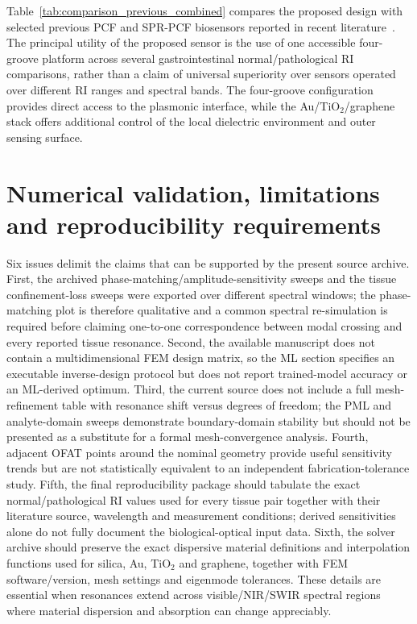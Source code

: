 \documentclass[5p,times,twocolumn]{elsarticle}
\begin{document}
Table~\ref{tab:comparison_previous_combined} compares the proposed design with selected previous PCF and SPR-PCF biosensors reported in recent literature~\cite{Yasli2021Cancer,Mittal2023Photonics,Ehyaee2023EPJ,Chaudhary2022TNB,Sardar2024JSEN,Abdelghaffar2024JOSAB,Ibrahimi2023Plasmonics,Yang2023Plasmonics,Pappu2024Plasmonics,Arafin2024OME,Ashrafian2025SciRep,Khodatars2025SciRep,Jamil2025SBSR,Alam2025SBSR}. The principal utility of the proposed sensor is the use of one accessible four-groove platform across several gastrointestinal normal/pathological RI comparisons, rather than a claim of universal superiority over sensors operated over different RI ranges and spectral bands. The four-groove configuration provides direct access to the plasmonic interface, while the Au/TiO$_2$/graphene stack offers additional control of the local dielectric environment and outer sensing surface.




\section{Numerical validation, limitations and reproducibility requirements}
\label{sec:limitations}

Six issues delimit the claims that can be supported by the present source archive. First, the archived phase-matching/amplitude-sensitivity sweeps and the tissue confinement-loss sweeps were exported over different spectral windows; the phase-matching plot is therefore qualitative and a common spectral re-simulation is required before claiming one-to-one correspondence between modal crossing and every reported tissue resonance. Second, the available manuscript does not contain a multidimensional FEM design matrix, so the ML section specifies an executable inverse-design protocol but does not report trained-model accuracy or an ML-derived optimum. Third, the current source does not include a full mesh-refinement table with resonance shift versus degrees of freedom; the PML and analyte-domain sweeps demonstrate boundary-domain stability but should not be presented as a substitute for a formal mesh-convergence analysis. Fourth, adjacent OFAT points around the nominal geometry provide useful sensitivity trends but are not statistically equivalent to an independent fabrication-tolerance study. Fifth, the final reproducibility package should tabulate the exact normal/pathological RI values used for every tissue pair together with their literature source, wavelength and measurement conditions; derived sensitivities alone do not fully document the biological-optical input data. Sixth, the solver archive should preserve the exact dispersive material definitions and interpolation functions used for silica, Au, TiO$_2$ and graphene, together with FEM software/version, mesh settings and eigenmode tolerances. These details are essential when resonances extend across visible/NIR/SWIR spectral regions where material dispersion and absorption can change appreciably.
\end{document}
